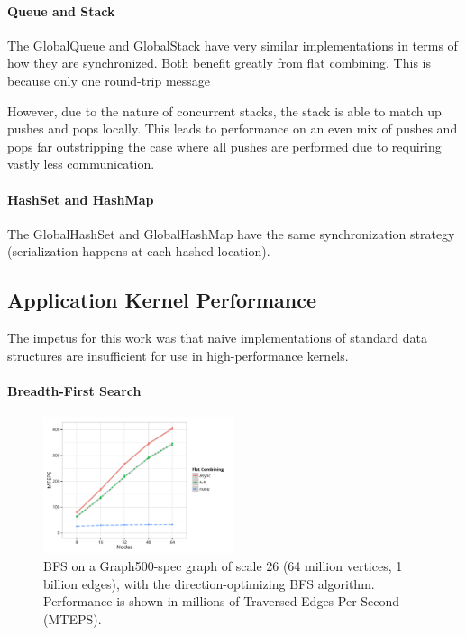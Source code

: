 \paragraph{Queue and Stack}
The GlobalQueue and GlobalStack have very similar implementations in terms of how they are synchronized. Both benefit greatly from flat combining. This is because only one round-trip message 

However, due to the nature of concurrent stacks, the stack is able to match up pushes and pops locally. This leads to performance on an even mix of pushes and pops far outstripping the case where all pushes are performed due to requiring vastly less communication.

\paragraph{HashSet and HashMap}
The GlobalHashSet and GlobalHashMap have the same synchronization strategy (serialization happens at each hashed location).

\subsection{Application Kernel Performance}
The impetus for this work was that naive implementations of standard data structures are insufficient for use in high-performance kernels.

\paragraph{Breadth-First Search}
\begin{figure}[t]
  \centering
  \includegraphics[width=0.5\textwidth]{data/plots/bfs_perf.pdf}
  \caption{BFS on a Graph500-spec graph of scale 26 (64 million vertices, 1 billion edges), with the direction-optimizing BFS algorithm. Performance is shown in millions of Traversed Edges Per Second (MTEPS).}
  \label{fig:bfs_perf}
\end{figure}



